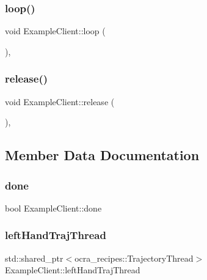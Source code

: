 \subsubsection{\texorpdfstring{loop()}{loop()}}
{\footnotesize\ttfamily void Example\+Client\+::loop (\begin{DoxyParamCaption}{ }\end{DoxyParamCaption})\hspace{0.3cm}{\ttfamily [protected]}, {\ttfamily [virtual]}}

\hypertarget{classExampleClient_a5acf25784c1c5b51c2c085327f195002}{}\label{classExampleClient_a5acf25784c1c5b51c2c085327f195002} 
\subsubsection{\texorpdfstring{release()}{release()}}
{\footnotesize\ttfamily void Example\+Client\+::release (\begin{DoxyParamCaption}{ }\end{DoxyParamCaption})\hspace{0.3cm}{\ttfamily [protected]}, {\ttfamily [virtual]}}



\subsection{Member Data Documentation}
\hypertarget{classExampleClient_acd2cf0f0479ff8bbf5b64924d83beb60}{}\label{classExampleClient_acd2cf0f0479ff8bbf5b64924d83beb60} 
\subsubsection{\texorpdfstring{done}{done}}
{\footnotesize\ttfamily bool Example\+Client\+::done\hspace{0.3cm}{\ttfamily [private]}}

\hypertarget{classExampleClient_a4311b0e8c4878c23df2b5ba048d8bc05}{}\label{classExampleClient_a4311b0e8c4878c23df2b5ba048d8bc05} 
\subsubsection{\texorpdfstring{left\+Hand\+Traj\+Thread}{leftHandTrajThread}}
{\footnotesize\ttfamily std\+::shared\+\_\+ptr$<$ocra\+\_\+recipes\+::\+Trajectory\+Thread$>$ Example\+Client\+::left\+Hand\+Traj\+Thread\hspace{0.3cm}{\ttfamily [private]}}

